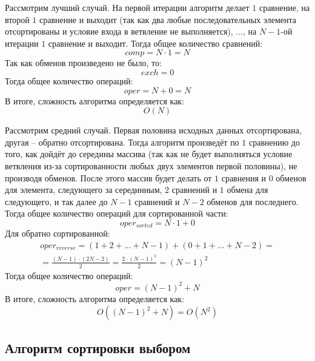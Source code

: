 Рассмотрим лучший случай. На первой итерации алгоритм делает $1$ сравнение, на второй $1$ сравнение и выходит (так как два любые последовательных элемента отсортированы и условие входа в ветвление не выполняется), ..., на $N-1$-ой итерации $1$ сравнение и выходит. Тогда общее количество сравнений:
\begin{equation}
	comp = N \cdot 1 = N
\end{equation}
Так как обменов произведено не было, то:
\begin{equation}
	exch = 0
\end{equation}
Тогда общее количество операций:
\begin{equation}
	oper = N + 0 = N
\end{equation}
В итоге, сложность алгоритма определяется как:
\begin{equation}
	O(N)
\end{equation}

Рассмотрим средний случай. Первая половина исходных данных отсортирована, другая -- обратно отсортирована. Тогда алгоритм произведёт по $1$ сравнению до того, как дойдёт до середины массива (так как не будет выполняться условие ветвления из-за сортированности любых двух элементов первой половины), не производя обменов. После этого массив будет делать от $1$ сравнения и $0$ обменов для элемента, следующего за серединным, $2$ сравнений и $1$ обмена для следующего, и так далее до $N-1$ сравнений и $N-2$ обменов для последнего.
Тогда общее количество операций для сортированной части:
\begin{equation}
	oper_{sorted} = N \cdot 1 + 0
\end{equation}
Для обратно сортированной:
\begin{multline}
	oper_{reverse} = (1 + 2 + ... + N-1) + (0 + 1 + ... + N-2)  = \\
	= \frac{(N-1) \cdot (2N-2)}{2} = \frac{2 \cdot (N-1)^2}{2} = (N-1)^2
\end{multline}
Тогда общее количество операций:
\begin{equation}
	oper = (N-1)^2 + N
\end{equation}
В итоге, сложность алгоритма определяется как:
\begin{equation}
	O((N-1)^2 + N) = O(N^2)
\end{equation}


\subsection{Алгоритм сортировки выбором}

